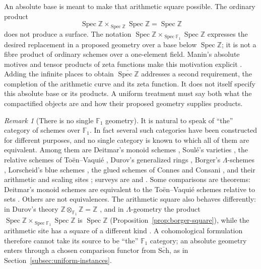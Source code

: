 \documentclass[11pt]{amsart}
\theoremstyle{plain}
\theoremstyle{definition}
\theoremstyle{remark}
\newtheorem{remark}[theorem]{Remark}
\numberwithin{equation}{section}
\newcommand{\Z}{\mathbb{Z}}
\newcommand{\F}{\mathbb{F}}
\newcommand{\Schbar}{\overline{\mathrm{Sch}}}
\DeclareMathOperator{\Spec}{Spec}
\begin{document}
An absolute base is meant to make that arithmetic square possible.
The ordinary product
\[
 \Spec\Z\times_{\Spec\Z}\Spec\Z=\Spec\Z
\]
does not produce a surface. The notation
$\Spec\Z\times_{\Spec\F_1}\Spec\Z$ expresses the desired replacement
in a proposed geometry over a base below $\Spec\Z$; it is not a fibre
product of ordinary schemes over a one-element field. Manin's absolute
motives and tensor products of zeta functions make this motivation
explicit \cite[p.~121, p.~132, and \S5.2, p.~158]{Manin1995Lectures}.
Adding the infinite places to obtain $\overline{\Spec\Z}$ addresses a
second requirement, the completion of the arithmetic curve and its zeta
function. It does not itself specify this absolute base or its products.
A uniform treatment must say both what the compactified objects are
and how their proposed geometry supplies products.

\begin{remark}[There is no single $\F_1$ geometry]
\label{rem:f1-not-unique}
It is natural to speak of ``the'' category of schemes over $\F_1$. In
fact several such categories have been constructed for different
purposes, and no single category is known to which all of them are
equivalent. Among them are Deitmar's monoid schemes
\cite{Deitmar2004SchemesF1}, Soul\'e's varieties
\cite{Soule2003Varietes}, the relative schemes of Toën--Vaquié
\cite{ToenVaquie2005SpecZ}, Durov's generalized rings
\cite{Durov2007Arakelov}, Borger's $\Lambda$-schemes
\cite{Borger2009Lambda}, Lorscheid's blue schemes
\cite{Lorscheid2011Blueprints}, the glued schemes of Connes and
Consani \cite{ConnesConsani2009SchemesF1}, and their arithmetic and
scaling sites
\cite{ConnesConsani2014ArithmeticSite,ConnesConsani2015ScalingSite};
surveys are \cite{LopezPenaLorscheid2009Mapping} and
\cite[p.~1]{Lorscheid2018Everyone}. Some comparisons are theorems:
Deitmar's monoid schemes are equivalent to the Toën--Vaquié schemes
relative to sets \cite[Theorem~36]{Vezzani2010Deitmar}. Others
are not equivalences. The arithmetic square also behaves differently:
in Durov's theory $\Z\otimes_{\F_1}\Z=\Z$
\cite[0.5.19, p.~36]{Durov2007Arakelov}, and in $\Lambda$-geometry the
product $\Spec\Z\times_{\Spec\F_1}\Spec\Z$ is $\Spec\Z$
(Proposition~\ref{prop:borger-square}), while the arithmetic site has
a square of a different kind
\cite[\S6, p.~22]{ConnesConsani2016ArithmeticGeometry}. A cohomological
formulation therefore cannot take its source to be ``the'' $\F_1$
category; an absolute geometry enters through a chosen comparison
functor from $\Schbar$, as in
Section~\ref{subsec:uniform-instances}.
\end{remark}
\end{document}
